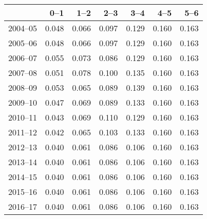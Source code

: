 \begin{table}[ht]
\centering
\begin{tabular}{rrrrrrr}
  \hline
 & 0--1 & 1--2 & 2--3 & 3--4 & 4--5 & 5--6 \\ 
  \hline
2004--05 & 0.048 & 0.066 & 0.097 & 0.129 & 0.160 & 0.163 \\ 
  2005--06 & 0.048 & 0.066 & 0.097 & 0.129 & 0.160 & 0.163 \\ 
  2006--07 & 0.055 & 0.073 & 0.086 & 0.129 & 0.160 & 0.163 \\ 
  2007--08 & 0.051 & 0.078 & 0.100 & 0.135 & 0.160 & 0.163 \\ 
  2008--09 & 0.053 & 0.065 & 0.089 & 0.139 & 0.160 & 0.163 \\ 
  2009--10 & 0.047 & 0.069 & 0.089 & 0.133 & 0.160 & 0.163 \\ 
  2010--11 & 0.043 & 0.069 & 0.110 & 0.129 & 0.160 & 0.163 \\ 
  2011--12 & 0.042 & 0.065 & 0.103 & 0.133 & 0.160 & 0.163 \\ 
  2012--13 & 0.040 & 0.061 & 0.086 & 0.106 & 0.160 & 0.163 \\ 
  2013--14 & 0.040 & 0.061 & 0.086 & 0.106 & 0.160 & 0.163 \\ 
  2014--15 & 0.040 & 0.061 & 0.086 & 0.106 & 0.160 & 0.163 \\ 
  2015--16 & 0.040 & 0.061 & 0.086 & 0.106 & 0.160 & 0.163 \\ 
  2016--17 & 0.040 & 0.061 & 0.086 & 0.106 & 0.160 & 0.163 \\ 
   \hline
\end{tabular}
\end{table}
